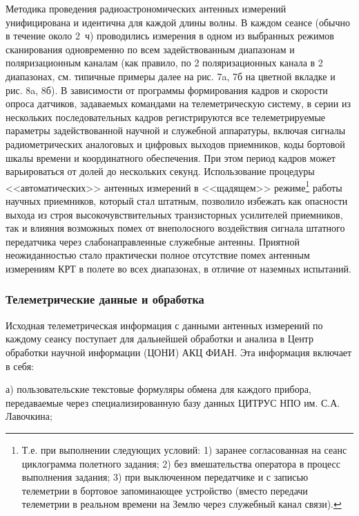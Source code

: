 Методика проведения радиоастрономических антенных измерений унифицирована и
идентична для каждой длины волны. В каждом сеансе (обычно в течение около 2~ч)
проводились измерения в одном из выбранных режимов сканирования
одновременно по всем задействованным диапазонам и поляризационным каналам
(как правило, по 2 поляризационных канала в 2 диапазонах,
см. типичные примеры далее на рис. 7a, 7б на цветной вкладке и   рис. 8a, 8б).
В зависимости от программы формирования кадров и скорости
опроса датчиков, задаваемых командами на телеметрическую систему,
в серии из нескольких последовательных кадров регистрируются все
телеметрируемые параметры задействованной научной и служебной аппаратуры,
включая сигналы радиометрических аналоговых и цифровых выходов приемников,
коды бортовой шкалы
времени и координатного обеспечения. При этом период кадров может
варьироваться от долей до нескольких секунд.
Использование процедуры <<автоматических>> антенных измерений
в <<щадящем>> режиме\footnote
{
Т.е. при выполнении следующих условий:
1) заранее согласованная на сеанс циклограмма полетного задания;
2) без вмешательства оператора в процесс выполнения задания;
3) при выключенном передатчике и с записью телеметрии в бортовое
запоминающее устройство (вместо передачи телеметрии в реальном
времени на Землю через служебный канал связи).
}
работы научных приемников, который стал штатным,
позволило избежать как опасности выхода из строя
высокочувствительных транзисторных усилителей приемников,
так и влияния возможных помех от внеполосного воздействия
сигнала штатного передатчика через слабонаправленные служебные антенны.
Приятной неожиданностью стало практически полное отсутствие помех
антенным измерениям КРТ в полете во всех диапазонах, в отличие от
наземных испытаний.


\subsubsection{Телеметрические данные и обработка}


Исходная телеметрическая информация с данными антенных измерений по
каждому сеансу поступает для дальнейшей обработки и анализа в
Центр обработки научной информации (ЦОНИ) АКЦ ФИАН. Эта информация
включает в себя:

а) пользовательские текстовые формуляры обмена
для каждого прибора, передаваемые через специализированную базу данных
ЦИТРУС НПО им. С.А. Лавочкина;

